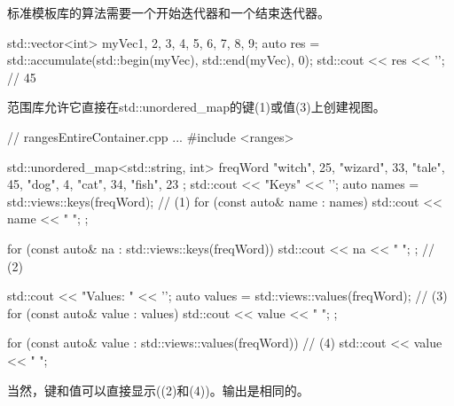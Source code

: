 标准模板库的算法需要一个开始迭代器和一个结束迭代器。

\begin{cpp}
std::vector<int> myVec{1, 2, 3, 4, 5, 6, 7, 8, 9};
auto res = std::accumulate(std::begin(myVec), std::end(myVec), 0);
std::cout << res << '\n'; // 45
\end{cpp}

范围库允许它直接在std::unordered\_map的键(1)或值(3)上创建视图。


\begin{cpp}
// rangesEntireContainer.cpp
...
#include <ranges>

std::unordered_map<std::string, int> freqWord{ {"witch", 25}, {"wizard", 33},
											   {"tale", 45}, {"dog", 4},
											   {"cat", 34}, {"fish", 23} };
std::cout << "Keys" << '\n';
auto names = std::views::keys(freqWord); // (1)
for (const auto& name : names){ std::cout << name << " "; };

for (const auto& na : std::views::keys(freqWord)){ std::cout << na << " "; }; // (2)

std::cout << "Values: " << '\n';
auto values = std::views::values(freqWord); // (3)
for (const auto& value : values){ std::cout << value << " "; };

for (const auto& value : std::views::values(freqWord)){ // (4)
	std::cout << value << " ";
}
\end{cpp}

当然，键和值可以直接显示((2)和(4))。输出是相同的。



























